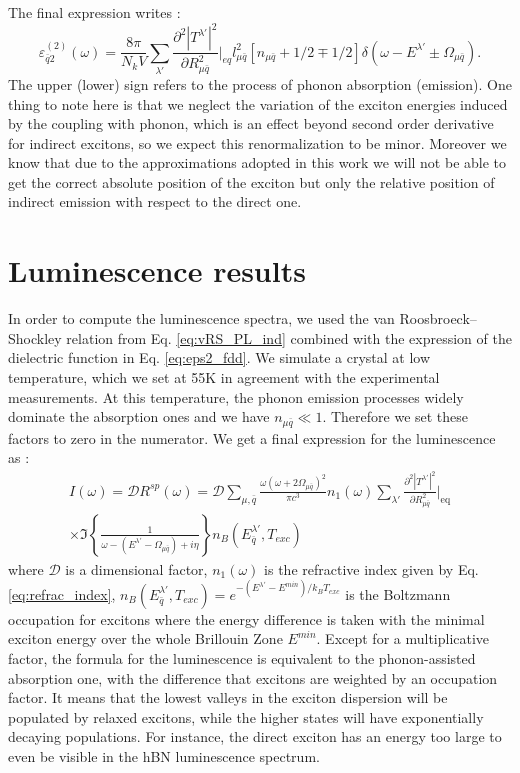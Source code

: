 The final expression writes :
\begin{equation}
	\varepsilon^{(2)}_{\bar{q}2}(\omega) = \frac{8\pi}{N_k V} \sum_{\lambda'} \frac{\partial^2 |T^{\lambda'}|^2}{\partial R^2_{\mu\bar{q}}}\biggr|_{eq} l^2_{\mu\bar{q}} \left[ n_{\mu\bar{q}} + 1/2 \mp 1/2 \right] \delta(\omega - E^{\lambda'} \pm \Omega_{\mu\bar{q}}). \label{eq:eps2_fdd}
\end{equation}
The upper (lower) sign refers to the process of phonon absorption (emission). One thing to note here is that we neglect the variation of the exciton energies induced by the coupling with phonon, which is an effect beyond second order derivative for indirect excitons, so we expect this renormalization to be minor.\cite{marini2008ab} Moreover we know that due to the approximations adopted in this work we will not be able to get the correct absolute position\cite{artus2021ellipsometry} of the exciton but only the relative position of indirect emission with respect to the direct one. 

%
\section{Luminescence results}
In order to compute the luminescence spectra, we used the van Roosbroeck--Shockley relation from Eq. \eqref{eq:vRS_PL_ind} combined with the expression of the dielectric function in Eq. \eqref{eq:eps2_fdd}. We simulate a crystal at low temperature, which we set at 55K in agreement with the experimental measurements. At this temperature, the phonon emission processes widely dominate the absorption ones and we have $n_{\mu \bar{q}} \ll  1$. Therefore we set these factors to zero in the numerator. We get a final expression for the luminescence as :
\begin{multline}
	I(\omega) = \mathcal{D} R^{sp}(\omega)= \mathcal{D} \sum_{\mu,{\bar{q}}} \frac{\omega(\omega + 2\Omega_{\mu \bar{q}})^2}{\pi c^3 } n_1(\omega) \sum_{\lambda'} \frac{\partial^2 |T^{\lambda'}|^2 }{\partial R_{\mu\bar{q}}^2}\biggr|_{\text{eq}} \\ \times	\Im \left\{\frac{1}{\omega-(E^{\lambda'}-\Omega_{\mu \bar{q}})+i\eta}\right\} n_B(E^{\lambda'}_{\bar{q}},T_{exc}) \label{eq:strain_vRS_PL}
\end{multline}
where $\mathcal{D}$ is a dimensional factor, $n_1(\omega)$ is the refractive index given by Eq. \eqref{eq:refrac_index}, $n_B(E^{\lambda'}_{\bar{q}},T_{exc}) = e^{-(E^{\lambda'}-E^{min})/k_BT_{exc}}$ is the Boltzmann occupation for excitons where the energy difference is taken with the minimal exciton energy over the whole Brillouin Zone $E^{min}$. Except for a multiplicative factor, the formula for the luminescence is equivalent to the phonon-assisted absorption one, with the difference that excitons are weighted by an occupation factor. It means that the lowest valleys in the exciton dispersion will be populated by relaxed excitons, while the higher states will have exponentially decaying populations.
For instance, the direct exciton has an energy too large to even be visible in the \acrshort{hBN} luminescence spectrum.

